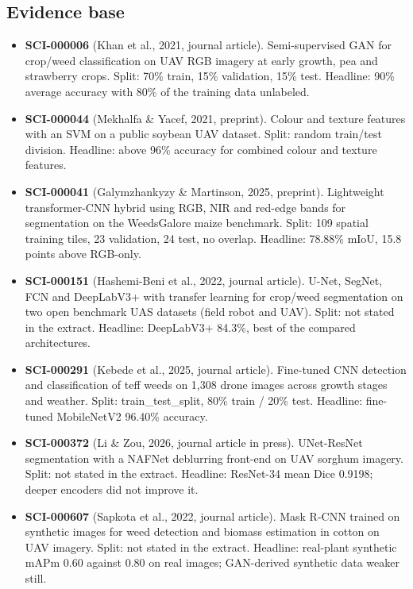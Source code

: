 \documentclass{article}
\begin{document}
\subsection{Evidence base}

\begin{itemize}
\item \textbf{SCI-000006} (Khan et al., 2021, journal article). Semi-supervised GAN for crop/weed
  classification on UAV RGB imagery at early growth, pea and strawberry crops. Split:
  70\% train, 15\% validation, 15\% test. Headline: 90\% average accuracy with 80\% of the
  training data unlabeled.
\item \textbf{SCI-000044} (Mekhalfa \& Yacef, 2021, preprint). Colour and texture features with an
  SVM on a public soybean UAV dataset. Split: random train/test division. Headline:
  above 96\% accuracy for combined colour and texture features.
\item \textbf{SCI-000041} (Galymzhankyzy \& Martinson, 2025, preprint). Lightweight transformer-CNN
  hybrid using RGB, NIR and red-edge bands for segmentation on the WeedsGalore maize
  benchmark. Split: 109 spatial training tiles, 23 validation, 24 test, no overlap.
  Headline: 78.88\% mIoU, 15.8 points above RGB-only.
\item \textbf{SCI-000151} (Hashemi-Beni et al., 2022, journal article). U-Net, SegNet, FCN and
  DeepLabV3+ with transfer learning for crop/weed segmentation on two open benchmark
  UAS datasets (field robot and UAV). Split: not stated in the extract. Headline:
  DeepLabV3+ 84.3\%, best of the compared architectures.
\item \textbf{SCI-000291} (Kebede et al., 2025, journal article). Fine-tuned CNN detection and
  classification of teff weeds on 1,308 drone images across growth stages and weather.
  Split: train\_test\_split, 80\% train / 20\% test. Headline: fine-tuned MobileNetV2
  96.40\% accuracy.
\item \textbf{SCI-000372} (Li \& Zou, 2026, journal article in press). UNet-ResNet segmentation
  with a NAFNet deblurring front-end on UAV sorghum imagery. Split: not stated in the
  extract. Headline: ResNet-34 mean Dice 0.9198; deeper encoders did not improve it.
\item \textbf{SCI-000607} (Sapkota et al., 2022, journal article). Mask R-CNN trained on synthetic
  images for weed detection and biomass estimation in cotton on UAV imagery. Split: not
  stated in the extract. Headline: real-plant synthetic mAPm 0.60 against 0.80 on real
  images; GAN-derived synthetic data weaker still.

\end{itemize}
\end{document}
